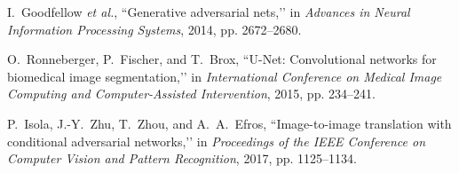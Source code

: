 \documentclass[lettersize,journal]{IEEEtran}
\begin{document}
\begin{thebibliography}{1}
I.~Goodfellow \emph{et al.}, ``Generative adversarial nets,’’ in \emph{Advances in Neural Information Processing Systems}, 2014, pp. 2672–2680.

O.~Ronneberger, P.~Fischer, and T.~Brox, ``U-Net: Convolutional networks for biomedical image segmentation,’’ in \emph{International Conference on Medical Image Computing and Computer-Assisted Intervention}, 2015, pp. 234–241.

P.~Isola, J.-Y.~Zhu, T.~Zhou, and A.~A.~Efros, ``Image-to-image translation with conditional adversarial networks,’’ in \emph{Proceedings of the IEEE Conference on Computer Vision and Pattern Recognition}, 2017, pp. 1125–1134.


\end{thebibliography}



\vfill
\end{document}
